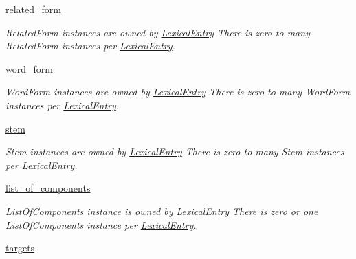 \begin{DoxyCompactItemize}
\hyperlink{classlmf_1_1src_1_1core_1_1lexical__entry_1_1_lexical_entry_a860127ced1990bb4f1639f23d989da27}{related\+\_\+form}
\begin{DoxyCompactList}\small\item\em Related\+Form instances are owned by \hyperlink{classlmf_1_1src_1_1core_1_1lexical__entry_1_1_lexical_entry}{Lexical\+Entry} There is zero to many Related\+Form instances per \hyperlink{classlmf_1_1src_1_1core_1_1lexical__entry_1_1_lexical_entry}{Lexical\+Entry}. \end{DoxyCompactList}\item 
\hyperlink{classlmf_1_1src_1_1core_1_1lexical__entry_1_1_lexical_entry_a6418f42441f0d6d25449270298010d03}{word\+\_\+form}
\begin{DoxyCompactList}\small\item\em Word\+Form instances are owned by \hyperlink{classlmf_1_1src_1_1core_1_1lexical__entry_1_1_lexical_entry}{Lexical\+Entry} There is zero to many Word\+Form instances per \hyperlink{classlmf_1_1src_1_1core_1_1lexical__entry_1_1_lexical_entry}{Lexical\+Entry}. \end{DoxyCompactList}\item 
\hyperlink{classlmf_1_1src_1_1core_1_1lexical__entry_1_1_lexical_entry_a381ed307ce61e5ae137abc94e45be36a}{stem}
\begin{DoxyCompactList}\small\item\em Stem instances are owned by \hyperlink{classlmf_1_1src_1_1core_1_1lexical__entry_1_1_lexical_entry}{Lexical\+Entry} There is zero to many Stem instances per \hyperlink{classlmf_1_1src_1_1core_1_1lexical__entry_1_1_lexical_entry}{Lexical\+Entry}. \end{DoxyCompactList}\item 
\hyperlink{classlmf_1_1src_1_1core_1_1lexical__entry_1_1_lexical_entry_a852239d30b350d7ec590c7a6a01b76b8}{list\+\_\+of\+\_\+components}
\begin{DoxyCompactList}\small\item\em List\+Of\+Components instance is owned by \hyperlink{classlmf_1_1src_1_1core_1_1lexical__entry_1_1_lexical_entry}{Lexical\+Entry} There is zero or one List\+Of\+Components instance per \hyperlink{classlmf_1_1src_1_1core_1_1lexical__entry_1_1_lexical_entry}{Lexical\+Entry}. \end{DoxyCompactList}\item 
\hyperlink{classlmf_1_1src_1_1core_1_1lexical__entry_1_1_lexical_entry_aaf11d999bc91a5cf161fd4ce0ca3319b}{targets}
\end{DoxyCompactItemize}


